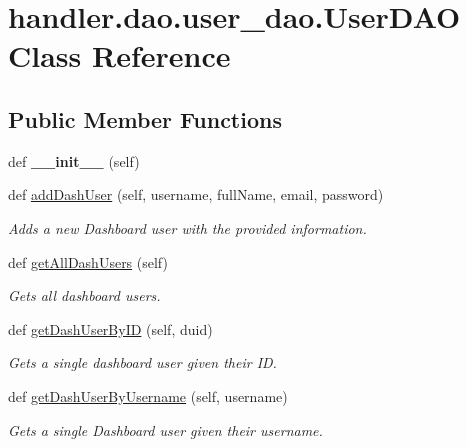 \hypertarget{classhandler_1_1dao_1_1user__dao_1_1_user_d_a_o}{}\section{handler.\+dao.\+user\+\_\+dao.\+User\+D\+AO Class Reference}
\label{classhandler_1_1dao_1_1user__dao_1_1_user_d_a_o}
\subsection*{Public Member Functions}
\begin{DoxyCompactItemize}
\item 
\mbox{\label{classhandler_1_1dao_1_1user__dao_1_1_user_d_a_o_aa0472f43603847189aa73d523db657b0}} 
def {\bfseries \+\_\+\+\_\+init\+\_\+\+\_\+} (self)
\item 
def \hyperlink{classhandler_1_1dao_1_1user__dao_1_1_user_d_a_o_a6e3f0dfc7e16a8ec2313502ca0298397}{add\+Dash\+User} (self, username, full\+Name, email, password)
\begin{DoxyCompactList}\small\item\em Adds a new Dashboard user with the provided information. \end{DoxyCompactList}\item 
def \hyperlink{classhandler_1_1dao_1_1user__dao_1_1_user_d_a_o_a25d86e662021b773fd0b49299079f443}{get\+All\+Dash\+Users} (self)
\begin{DoxyCompactList}\small\item\em Gets all dashboard users. \end{DoxyCompactList}\item 
def \hyperlink{classhandler_1_1dao_1_1user__dao_1_1_user_d_a_o_ad9be9aa0752a73abc15d413ff6f6f640}{get\+Dash\+User\+By\+ID} (self, duid)
\begin{DoxyCompactList}\small\item\em Gets a single dashboard user given their ID. \end{DoxyCompactList}\item 
def \hyperlink{classhandler_1_1dao_1_1user__dao_1_1_user_d_a_o_a8c86f277f03acade4ca12983f0a05d10}{get\+Dash\+User\+By\+Username} (self, username)
\begin{DoxyCompactList}\small\item\em Gets a single Dashboard user given their username. \end{DoxyCompactList}\item 

\end{DoxyCompactItemize}
